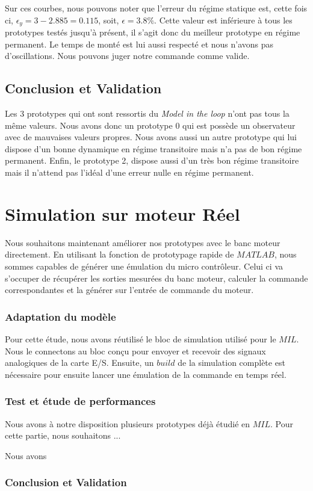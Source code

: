 		Sur ces courbes, nous pouvons noter que l'erreur du régime statique est, cette fois ci, $\epsilon_y = 3 - 2.885 = 0.115$, soit, $\epsilon = 3.8\%$. Cette valeur est inférieure à tous les prototypes testés jusqu'à présent, il s'agit donc du meilleur prototype en régime permanent. Le temps de monté est lui aussi respecté et nous n'avons pas d'oscillations. Nous pouvons juger notre commande comme valide.
		\subsection{Conclusion et Validation}
	Les 3 prototypes qui ont sont ressortis du \emph{Model in the loop} n'ont pas tous la même valeurs. Nous avons donc un prototype 0 qui est possède un observateur avec de mauvaises valeurs propres. Nous avons aussi un autre prototype qui lui dispose d'un bonne dynamique en régime transitoire mais n'a pas de bon régime permanent. Enfin, le prototype 2, dispose aussi d'un très bon régime transitoire mais il n'attend pas l'idéal d'une erreur nulle en régime permanent. 
	\section{Simulation sur moteur Réel}
		Nous souhaitons maintenant améliorer nos prototypes avec le banc moteur directement. En utilisant la fonction de prototypage rapide de $MATLAB$, nous sommes capables de générer une émulation du micro contrôleur. Celui ci va s'occuper de récupérer les sorties mesurées du banc moteur, calculer la commande correspondantes et la générer sur l'entrée de commande du moteur. 
		\subsubsection{Adaptation du modèle}
		Pour cette étude, nous avons réutilisé le bloc de simulation utilisé pour le $MIL$. Nous le connectons au bloc conçu pour envoyer et recevoir des signaux analogiques de la carte E/S. Ensuite, un $build$ de la simulation complète est nécessaire pour ensuite lancer une émulation de la commande en temps réel. 
		\subsubsection{Test et étude de performances}
		Nous avons à notre disposition plusieurs prototypes déjà étudié en $MIL$. Pour cette partie, nous souhaitons ...
		
		Nous avons 
		\subsubsection{Conclusion et Validation}
		
